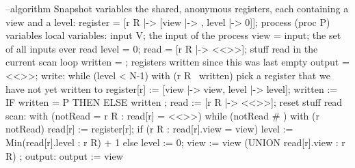 \documentclass{article}
\begin{document}
\begin{linenumbers}

\begin{pcal}
--algorithm Snapshot {
    variables
        \* the shared, anonymous registers, each containing a view and a level:
        register = [r \in R |-> [view |-> {}, level |-> 0]];
    process (proc \in P)
        variables \* local variables:
            input \in V; \* the input of the process
            view = {input}; \* the set of all inputs ever read
            level = 0;
	    read = [r \in R |-> <<>>]; \* stuff read in the current scan loop
            written = {}; { \* registers written since this was last empty
	    output = <<>>;
write:  while (level < N-1) {
            with (r \in R \ written) { \* pick a register that we have not yet written to
                register[r] := [view |-> view, level |-> level];
                written := IF written  = P THEN {} ELSE written  };
	    read := [r \in R |-> <<>>]; \* reset stuff read
scan:       with (notRead = {r \in R : read[r] = <<>>})
	    while (notRead # {}) with (r \in notRead)
                read[r] := register[r];
            if (\A r \in R : read[r].view = view)
                level := Min({read[r].level : r \in R}) + 1
            else
                level := 0;
            view := view \cup (UNION {read[r].view : r \in R}) };
output: output := view } }
\end{pcal}

\end{linenumbers}
\end{document}
